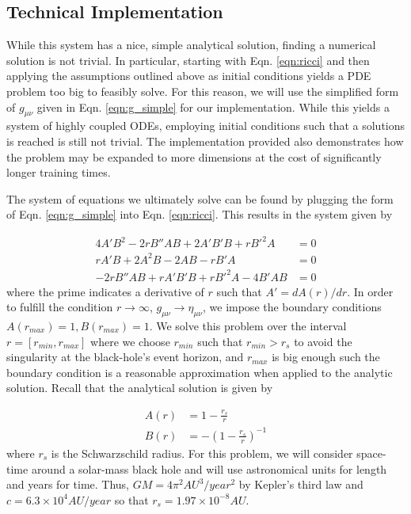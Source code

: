 \documentclass{CUP-JNL-DTM}%
\theoremstyle{definition}
\numberwithin{equation}{section}
\begin{document}
\subsection{Technical Implementation}

While this system has a nice, simple analytical solution, finding a numerical solution is not trivial. In particular, starting with Eqn. \ref{eqn:ricci} and then applying the assumptions outlined above as initial conditions yields a PDE problem too big to feasibly solve. For this reason, we will use the simplified form of $g_{\mu\nu}$ given in Eqn. \ref{eqn:g_simple} for our implementation. While this yields a system of highly coupled ODEs, employing initial conditions such that a solutions is reached is still not trivial. The implementation provided also demonstrates how the problem may be expanded to more dimensions at the cost of significantly longer training times. 

The system of equations we ultimately solve can be found by plugging the form of Eqn. \ref{eqn:g_simple} into Eqn. \ref{eqn:ricci}. This results in the system given by 

\begin{equation}
\begin{split}
    4A'B^2 - 2rB''AB + 2A'B'B + rB'^2A & = 0 \\
    rA'B + 2A^2B - 2AB - rB'A & = 0 \\ 
    -2rB''AB + rA'B'B + rB'^2A - 4B'AB & = 0
\end{split}
\end{equation}
where the prime indicates a derivative of $r$ such that $A' = dA(r)/dr$. In order to fulfill the condition $r \rightarrow \infty$, $g_{\mu\nu} \rightarrow \eta_{\mu\nu}$, we impose the boundary conditions $A(r_{max}) = 1, B(r_{max}) = 1$. We solve this problem over the interval $r = [r_{min}, r_{max}]$ where we choose $r_{min}$ such that $r_{min} > r_s$ to avoid the singularity at the black-hole's event horizon, and $r_{max}$ is big enough such the boundary condition is a reasonable approximation when applied to the analytic solution. Recall that the analytical solution is given by 

\begin{equation}
\begin{split}
    A(r) & = 1 - \frac{r_s}{r} \\ 
    B(r) & = -\left(1 - \frac{r_s}{r}\right)^{-1}
\end{split}
\end{equation}
where $r_s$ is the Schwarzschild radius. For this problem, we will consider space-time around a solar-mass black hole and will use astronomical units for length and years for time. Thus, $GM = 4\pi^2\si{AU^{3}/year^2}$ by Kepler's third law and $c = 6.3 \times 10^4 \si{AU/year}$ so that $r_s = 1.97 \times 10^{-8} \si{AU}$. 
\end{document}
